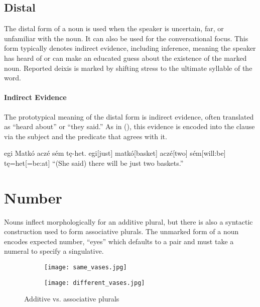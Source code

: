 \subsection{Distal}
The distal form of a noun is used when the speaker is uncertain, far, or unfamiliar with the noun. It can also be used for the conversational focus. This form typically denotes indirect evidence, including inference, meaning the speaker has heard of or can make an educated guess about the existence of the marked noun. Reported deixis is marked by shifting stress to the ultimate syllable of the word.

\paragraph{Indirect Evidence}
The prototypical meaning of the distal form is indirect evidence, often translated as “heard about” or “they said.” As in (\nextx), this evidence is encoded into the clause via the subject and the predicate that agrees with it.

\begin{gloss*}
\begingl
\glpreamble egi Matkó aczé sém tę-het.\endpreamble
egi[just]
matkó[basket\gbs{}]
aczé[two\gbs{}]
sém[will:be\gbs{}]
tę=het[=be:at]
\glft “(She said) there will be just two baskets.”
\endgl
\end{gloss*}

\section{Number}
Nouns inflect morphologically for an additive plural, but there is also a syntactic construction used to form associative plurals. The unmarked form of a noun encodes expected number, \eg {} “eyes” which defaults to a pair and must take a numeral to specify a singulative. 

\begin{figure}[h]
    \centering
    \begin{subfigure}{0.4\textwidth}
        \centering
        \texttt{[image: same\_vases.jpg]}
        \caption{}
    \end{subfigure}
    \begin{subfigure}{0.4\textwidth}
        \centering
        \texttt{[image: different\_vases.jpg]}
        \caption{}
    \end{subfigure}
    \caption{Additive vs. associative plurals}
\end{figure}

